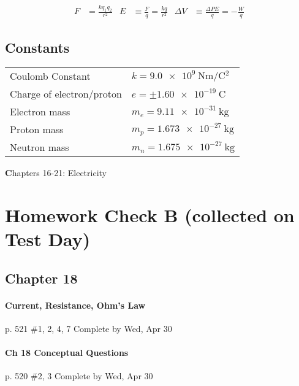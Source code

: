 \documentclass[10pt]{exam}
\def\mytitle{Chapters 16-21: Electricity}
\def\mymaketitle{
  \begin{flushleft}
    {\LARGE \textbf \mytitle \par}
  \end{flushleft}
}
\begin{document}
\begin{align*}
  F &= \frac{kq_1 q_2} {r^2} &
  E &\equiv \frac{F}{q} = \frac{kq}{r^2} &
  \Delta V &\equiv \frac{\Delta PE}{q} = -\frac{W}{q}
\end{align*}

\subsection*{Constants}

\vspace{2em}

\begin{tabular}{ll}
Coulomb Constant          &   $k = \SI{9.0e9}{\newton\meter\per\coulomb^2}$\\
Charge of electron/proton &   $e=\pm\SI{1.60e-19}{\coulomb}$\\
Electron mass             &   $m_e=\SI{9.11e-31}{\kilo\gram}$\\
Proton mass	              &   $m_p=\SI{1.673e-27}{\kilo\gram}$\\
Neutron mass	            &   $m_n=\SI{1.675e-27}{\kilo\gram}$
\end{tabular}


\pagebreak

\mymaketitle

\section*{Homework Check B (collected on Test Day)}



\subsection*{Chapter 18}




\paragraph{Current, Resistance, Ohm's Law} p. 521 \#1, 2, 4, 7
\dotfill Complete by Wed, Apr 30




\paragraph{Ch 18 Conceptual Questions} p. 520 \#2, 3
\dotfill Complete by Wed, Apr 30
   
\end{document}
